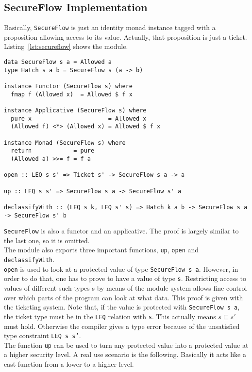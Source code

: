 \subsection{SecureFlow Implementation}
Basically, \texttt{SecureFlow} is just an identity monad instance tagged with a proposition allowing access to its value. Actually, that proposition is just a ticket. Listing~\ref{lst:secureflow} shows the module.
\begin{lstlisting}[caption={SecureFlow monad}, label={lst:secureflow}, breaklines=true]
data SecureFlow s a = Allowed a
type Hatch s a b = SecureFlow s (a -> b)

instance Functor (SecureFlow s) where
  fmap f (Allowed x)  = Allowed $ f x

instance Applicative (SecureFlow s) where
  pure x                      = Allowed x
  (Allowed f) <*> (Allowed x) = Allowed $ f x

instance Monad (SecureFlow s) where
  return            = pure
  (Allowed a) >>= f = f a
  
open :: LEQ s s' => Ticket s' -> SecureFlow s a -> a

up :: LEQ s s' => SecureFlow s a -> SecureFlow s' a

declassifyWith :: (LEQ s k, LEQ s' s) => Hatch k a b -> SecureFlow s a -> SecureFlow s' b
\end{lstlisting}
%
%

\texttt{SecureFlow} is also a functor and an applicative. The proof is largely similar to the last one, so it is omitted. \\
The module also exports three important functions, \texttt{up}, \texttt{open} and \texttt{declassifyWith}. \\
\texttt{open} is used to look at a protected value of type \texttt{SecureFlow s a}. However, in order to do that, one has to prove to have a value of type \texttt{s}. Restricting access to values of different such types s by means of the module system allows fine control over which parts of the program can look at what data. This proof is given with the ticketing system. Note that, if the value is protected with \texttt{SecureFlow s a}, the ticket type must be in the \texttt{LEQ} relation with \texttt{s}. This actually means $s \sqsubseteq s'$ must hold. Otherwise the compiler gives a type error because of the unsatisfied type constraint \texttt{LEQ s s'}. \\
The function \texttt{up} can be used to turn any protected value into a protected value at a higher security level. A real use scenario is the following. Basically it acts like a cast function from a lower to a higher level. 
